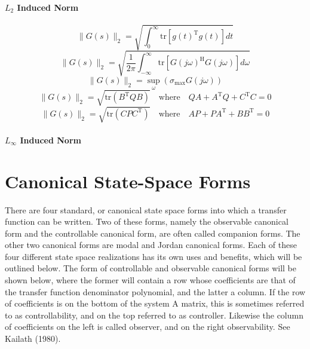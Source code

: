 \paragraph{$L_{2}$ Induced Norm}
\begin{equation*}
  \|G(s)\|_{2}=\sqrt{\int_{0}^{\infty}\text{tr}[{g(t)}^{\text{T}}g(t)]dt}
\end{equation*}
\begin{equation*}
  \|G(s)\|_{2}=\sqrt{\frac{1}{2\pi}\int_{-\infty}^{\infty}\text{tr}[{G(j\omega)}^{\text{H}}G(j\omega)]d\omega}
\end{equation*}
\begin{equation*}
  \|G(s)\|_{2}=\sup_{\omega}(\sigma_{\max}G(j\omega))
\end{equation*}
\begin{equation*}
  \|G(s)\|_{2}=\sqrt{\text{tr}(B^{\text{T}}QB)} \quad \text{where} \quad
  QA+A^{\text{T}}Q+C^{\text{T}}C=0
\end{equation*}
\begin{equation*}
  \|G(s)\|_{2}=\sqrt{\text{tr}(CPC^{\text{T}})} \quad \text{where} \quad
  AP+PA^{\text{T}}+BB^{\text{T}}=0
\end{equation*}

\paragraph{$L_{\infty}$ Induced Norm}

\section{Canonical State-Space Forms}

There are four standard, or canonical state space forms into which a transfer function can be written.
Two of these forms, namely the observable canonical form and the controllable canonical form, are often called companion forms.
The other two canonical forms are modal and Jordan canonical forms.
Each of these four different state space realizations has its own uses and benefits, which will be outlined below.
The form of controllable and observable canonical forms will be shown below, where the former will contain a row whose coefficients are that of the transfer function denominator polynomial, and the latter a column.
If the row of coefficients is on the bottom of the system A matrix, this is sometimes referred to as controllability, and on the top referred to as controller.
Likewise the column of coefficients on the left is called observer, and on the right observability.
See Kailath (1980).

